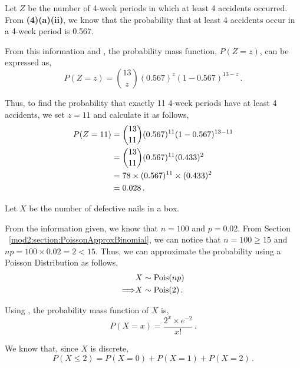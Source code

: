 \begin{subquestions}
\begin{subsubquestions}
\subsubquestion

Let $Z$ be the number of 4-week periods in which at least 4 accidents occurred. From \textbf{(4)(a)(ii)}, we know that the probability that at least 4 accidents occur in a 4-week period is 0.567.

From this information and , the probability mass function, $P(Z=z)$, can be expressed as,
\begin{equation}
		P(Z = z) = { 13 \choose z} (0.567)^z  (1-0.567)^{13-z} \,.
\end{equation}

Thus, to find the probability that exactly 11 4-week periods have at least 4 accidents, we set $z=11$ and calculate it as follows,
\begin{align}
	P(Z = 11) & = { 13 \choose 11} (0.567)^{11}  (1-0.567)^{13-11} \nonumber \\
	          & = { 13 \choose 11} (0.567)^{11}  (0.433)^{2} \nonumber \\
	          & = 78 \times (0.567)^{11} \times (0.433)^{2} \nonumber \\
	          & = 0.028 \,.
\end{align}

\end{subsubquestions}


\subquestion

Let $X$ be the number of defective nails in a box.

From the information given, we know that $n=100$ and $p=0.02$. From Section ~\ref{mod2:section:PoissonApproxBinomial}, we can notice that $n=100 \geq 15$ and $np= 100 \times 0.02=2<15.$ Thus, we can approximate the probability using a Poisson Distribution as follows,
\begin{align}
	& X \sim \text{Pois}(np) \nonumber \\
	\Longrightarrow & X \sim \text{Pois}(2) \,.
\end{align}

Using , the probability mass function of $X$ is,
\begin{equation}
	P(X=x)= \frac{2^x \times e^{-2}}{x!} \,.
\end{equation}

We know that, since $X$ is discrete,
\begin{equation}
	P(X \leq 2) = P(X=0)+P(X=1)+P(X=2) \,.
\end{equation}


\end{subquestions}

